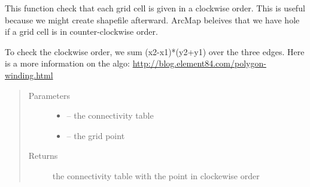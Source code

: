 \documentclass[letterpaper,10pt,english]{sphinxmanual}
\begin{document}
\begin{fulllineitems}
\label{\detokenize{index:src.mesh_grid2.check_clockwise}}
This function check that each grid cell is given in a clockwise order. This is useful because we might create
shapefile afterward. ArcMap beleives that we have hole if a grid cell is in counter-clockwise order.

To check the clockwise order, we sum (x2-x1)*(y2+y1) over the three edges.
Here is a more information on the algo: \url{http://blog.element84.com/polygon-winding.html}
\begin{quote}\begin{description}
\item[{Parameters}] \leavevmode\begin{itemize}
\item {} 
 -- the connectivity table

\item {} 
 -- the grid point

\end{itemize}

\item[{Returns}] \leavevmode
the connectivity table with the point in clockewise order

\end{description}\end{quote}

\end{fulllineitems}

\end{document}
